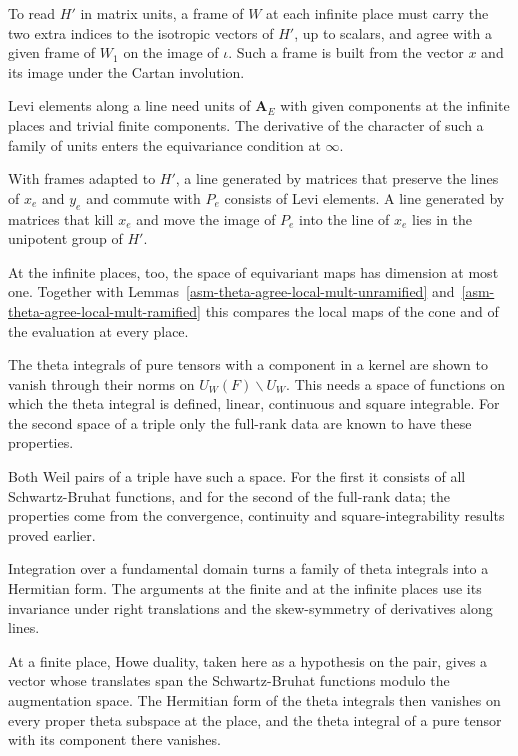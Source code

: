 To read $H'$ in matrix units, a frame of $W$ at each infinite place must carry
the two extra indices to the isotropic vectors of $H'$, up to scalars, and agree
with a given frame of $W_1$ on the image of $\iota$. Such a frame is built from
the vector $x$ and its image under the Cartan involution.

Levi elements along a line need units of $\mathbf A_E$ with given components at
the infinite places and trivial finite components. The derivative of the
character of such a family of units enters the equivariance condition at
$\infty$.

With frames adapted to $H'$, a line generated by matrices that preserve the
lines of $x_e$ and $y_e$ and commute with $P_e$ consists of Levi elements. A
line generated by matrices that kill $x_e$ and move the image of $P_e$ into the
line of $x_e$ lies in the unipotent group of $H'$.

At the infinite places, too, the space of equivariant maps has dimension at most
one. Together with Lemmas~\ref{asm-theta-agree-local-mult-unramified}
and~\ref{asm-theta-agree-local-mult-ramified} this compares the local maps of
the cone and of the evaluation at every place.

The theta integrals of pure tensors with a component in a kernel are shown to
vanish through their norms on $U_W(F)\backslash U_W$. This needs a space of
functions on which the theta integral is defined, linear, continuous and square
integrable. For the second space of a triple only the full-rank data are known
to have these properties.

Both Weil pairs of a triple have such a space. For the first it consists of all
Schwartz-Bruhat functions, and for the second of the full-rank data; the
properties come from the convergence, continuity and square-integrability
results proved earlier.

Integration over a fundamental domain turns a family of theta integrals into a
Hermitian form. The arguments at the finite and at the infinite places use its
invariance under right translations and the skew-symmetry of derivatives along
lines.

At a finite place, Howe duality, taken here as a hypothesis on the pair, gives
a vector whose translates span the Schwartz-Bruhat functions modulo the
augmentation space. The Hermitian form of
the theta integrals then vanishes on every proper theta subspace at the place,
and the theta integral of a pure tensor with its component there vanishes.

